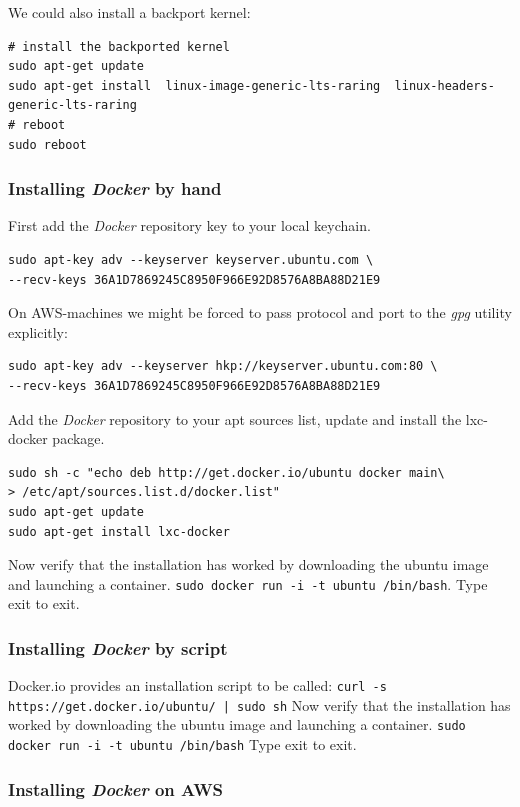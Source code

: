 \documentclass[11pt]{article}
\begin{document}
We could also install a backport kernel:

\begin{verbatim}
# install the backported kernel
sudo apt-get update
sudo apt-get install  linux-image-generic-lts-raring  linux-headers-generic-lts-raring
# reboot
sudo reboot
\end{verbatim}
\subsubsection{Installing \emph{Docker} by hand}
\label{sec-2-1-2}

First add the \emph{Docker} repository key to your local keychain.

\begin{verbatim}
sudo apt-key adv --keyserver keyserver.ubuntu.com \
--recv-keys 36A1D7869245C8950F966E92D8576A8BA88D21E9
\end{verbatim}
On AWS-machines we might be forced to pass protocol and port to the \emph{gpg} utility explicitly: 

\begin{verbatim}
sudo apt-key adv --keyserver hkp://keyserver.ubuntu.com:80 \
--recv-keys 36A1D7869245C8950F966E92D8576A8BA88D21E9
\end{verbatim}

Add the \emph{Docker} repository to your apt sources list, update and install
the lxc-docker package. 
 

\begin{verbatim}
sudo sh -c "echo deb http://get.docker.io/ubuntu docker main\
> /etc/apt/sources.list.d/docker.list"
sudo apt-get update
sudo apt-get install lxc-docker
\end{verbatim}
Now verify that the installation has worked by downloading the ubuntu
image and launching a container. \texttt{sudo docker run -i -t ubuntu /bin/bash}.
Type exit to exit.
\subsubsection{Installing \emph{Docker} by script}
\label{sec-2-1-3}

Docker.io provides an installation script to be called: \texttt{curl -s https://get.docker.io/ubuntu/ | sudo sh}
Now verify that the installation has worked by downloading the ubuntu
image and launching a container. \texttt{sudo docker run -i -t ubuntu /bin/bash}
Type exit to exit.
\subsubsection{Installing \emph{Docker}  on AWS}
\label{sec-2-1-4}
\end{document}

